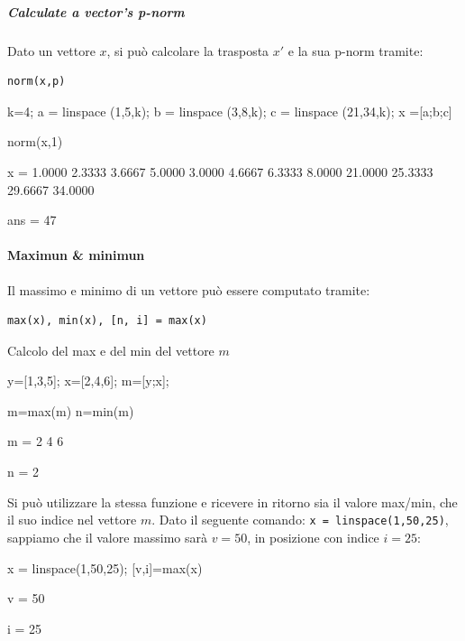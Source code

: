 \subparagraph{Calculate a vector's p-norm}
Dato un vettore $ x $, si può calcolare la trasposta $ x' $ e la sua p-norm tramite:
\begin{verbatim}
norm(x,p)
\end{verbatim}
\begin{example}
\end{example}
\begin{matlab}
    k=4;
    a = linspace (1,5,k);
    b = linspace (3,8,k);
    c = linspace (21,34,k);
    x =[a;b;c]

    norm(x,1)
\end{matlab}
\begin{matlabconsole}
    x =
    1.0000  2.3333  3.6667  5.0000
    3.0000  4.6667  6.3333  8.0000
    21.0000 25.3333 29.6667 34.0000

    ans =
    47
\end{matlabconsole}

\paragraph{Maximun \& minimun}
Il massimo e minimo di un vettore può essere computato tramite:
\begin{verbatim}
max(x), min(x), [n, i] = max(x)
\end{verbatim}

\begin{example}
    Calcolo del max e del min del vettore $ m $
\end{example}
\begin{matlab}
    y=[1,3,5];
    x=[2,4,6];
    m=[y;x];

    m=max(m)
    n=min(m)
\end{matlab}
\begin{matlabconsole}
    m =
    2     4     6


    n =
    2
\end{matlabconsole}

Si può utilizzare la stessa funzione e ricevere in ritorno sia il valore max/min, che il suo indice nel vettore $ m $.
Dato il seguente comando: \verb|x = linspace(1,50,25)|, sappiamo che il valore massimo sarà $ v=50 $, in posizione con indice $ i=25 $:
\begin{matlab}
    x = linspace(1,50,25);
    [v,i]=max(x)
\end{matlab}
\begin{matlabconsole}
    v =
    50

    i =
    25
\end{matlabconsole}

